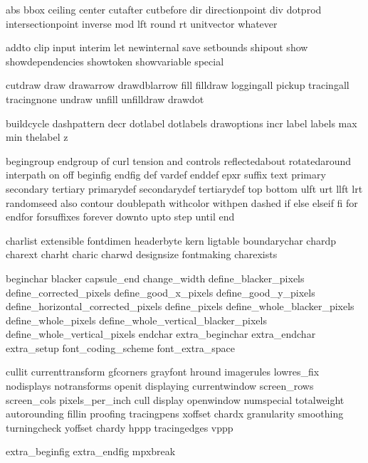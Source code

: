 \useprettyidentifiers \MPvariables \MPsetspecials
  abs bbox ceiling center cutafter cutbefore dir
  directionpoint div dotprod intersectionpoint inverse mod lft
  round rt unitvector whatever


\useprettyidentifiers \MPidentifiers \MPsetspecials
  addto clip input interim let newinternal save setbounds
  shipout show showdependencies showtoken showvariable
  special

\useprettyidentifiers \MPvariables \MPsetspecials
  cutdraw draw drawarrow drawdblarrow fill filldraw
  loggingall pickup tracingall tracingnone undraw unfill
  unfilldraw drawdot


\useprettyidentifiers \MPvariables \MPsetspecials
  buildcycle dashpattern decr dotlabel dotlabels drawoptions
  incr label labels max min thelabel z


\useprettyidentifiers \MPidentifiers \MPsetspecials
  begingroup endgroup of curl tension and controls
  reflectedabout rotatedaround interpath on off beginfig
  endfig def vardef enddef epxr suffix text primary secondary
  tertiary primarydef secondarydef tertiarydef top bottom
  ulft urt llft lrt randomseed also contour doublepath
  withcolor withpen dashed if else elseif fi for endfor
  forsuffixes forever downto upto step until end


\useprettyidentifiers \MPidentifiers \MPsetspecials
  charlist extensible fontdimen headerbyte kern ligtable
  boundarychar chardp charext charht charic charwd designsize
  fontmaking charexists

\useprettyidentifiers \MPvariables \MPsetspecials
  beginchar blacker capsule_end change_width
  define_blacker_pixels define_corrected_pixels
  define_good_x_pixels define_good_y_pixels
  define_horizontal_corrected_pixels define_pixels
  define_whole_blacker_pixels define_whole_pixels
  define_whole_vertical_blacker_pixels
  define_whole_vertical_pixels endchar extra_beginchar
  extra_endchar extra_setup font_coding_scheme
  font_extra_space


\useprettyidentifiers \MPidentifiers \MPsetspecials
  cullit currenttransform gfcorners grayfont hround
  imagerules lowres_fix nodisplays notransforms openit
  displaying currentwindow screen_rows screen_cols
  pixels_per_inch cull display openwindow numspecial
  totalweight autorounding fillin proofing tracingpens
  xoffset chardx granularity smoothing turningcheck yoffset
  chardy hppp tracingedges vppp


\useprettyidentifiers \MPidentifiers \MPsetspecials
  extra_beginfig extra_endfig mpxbreak

\protect

\endinput
